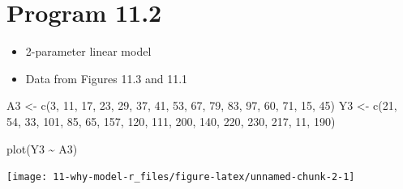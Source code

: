 \documentclass[
  10pt,
  a4paper,
]{book}
\newenvironment{Shaded}{\begin{snugshade}}{\end{snugshade}}
\newcommand{\DecValTok}[1]{\textcolor[rgb]{0.68,0.00,0.00}{#1}}
\newcommand{\FunctionTok}[1]{\textcolor[rgb]{0.28,0.35,0.67}{#1}}
\newcommand{\NormalTok}[1]{\textcolor[rgb]{0.00,0.46,0.62}{#1}}
\newcommand{\OtherTok}[1]{\textcolor[rgb]{0.00,0.46,0.62}{#1}}
\newcommand{\SpecialCharTok}[1]{\textcolor[rgb]{0.37,0.37,0.37}{#1}}
\providecommand{\tightlist}{%
  \setlength{\itemsep}{0pt}\setlength{\parskip}{0pt}}
\begin{document}
\hypertarget{program-11.2}{%
\section{Program 11.2}\label{program-11.2}}

\begin{itemize}
\tightlist
\item
  2-parameter linear model
\item
  Data from Figures 11.3 and 11.1
\end{itemize}

\begin{Shaded}
\begin{Highlighting}[]
\NormalTok{A3 }\OtherTok{\textless{}{-}}
  \FunctionTok{c}\NormalTok{(}\DecValTok{3}\NormalTok{, }\DecValTok{11}\NormalTok{, }\DecValTok{17}\NormalTok{, }\DecValTok{23}\NormalTok{, }\DecValTok{29}\NormalTok{, }\DecValTok{37}\NormalTok{, }\DecValTok{41}\NormalTok{, }\DecValTok{53}\NormalTok{, }\DecValTok{67}\NormalTok{, }\DecValTok{79}\NormalTok{, }\DecValTok{83}\NormalTok{, }\DecValTok{97}\NormalTok{, }\DecValTok{60}\NormalTok{, }\DecValTok{71}\NormalTok{, }\DecValTok{15}\NormalTok{, }\DecValTok{45}\NormalTok{)}
\NormalTok{Y3 }\OtherTok{\textless{}{-}}
  \FunctionTok{c}\NormalTok{(}\DecValTok{21}\NormalTok{, }\DecValTok{54}\NormalTok{, }\DecValTok{33}\NormalTok{, }\DecValTok{101}\NormalTok{, }\DecValTok{85}\NormalTok{, }\DecValTok{65}\NormalTok{, }\DecValTok{157}\NormalTok{, }\DecValTok{120}\NormalTok{, }\DecValTok{111}\NormalTok{, }\DecValTok{200}\NormalTok{, }\DecValTok{140}\NormalTok{, }\DecValTok{220}\NormalTok{, }\DecValTok{230}\NormalTok{, }\DecValTok{217}\NormalTok{,}
    \DecValTok{11}\NormalTok{, }\DecValTok{190}\NormalTok{)}

\FunctionTok{plot}\NormalTok{(Y3 }\SpecialCharTok{\textasciitilde{}}\NormalTok{ A3)}
\end{Highlighting}
\end{Shaded}

\begin{center}\texttt{[image: 11-why-model-r\_files/figure-latex/unnamed-chunk-2-1]} \end{center}
\end{document}
